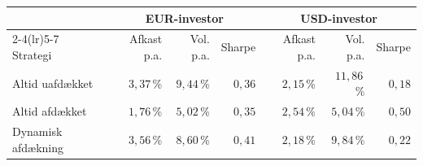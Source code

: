 \begin{tabular}{lrrrrrr}
\toprule
 & \multicolumn{3}{c}{EUR-investor} & \multicolumn{3}{c}{USD-investor} \\
\cmidrule(lr){2-4}\cmidrule(lr){5-7}
Strategi & Afkast p.a. & Vol. p.a. & Sharpe & Afkast p.a. & Vol. p.a. & Sharpe \\
\midrule
Altid uafdækket & $3{,}37$\,\% & $9{,}44$\,\% & $0{,}36$ & $2{,}15$\,\% & $11{,}86$\,\% & $0{,}18$ \\
Altid afdækket & $1{,}76$\,\% & $5{,}02$\,\% & $0{,}35$ & $2{,}54$\,\% & $5{,}04$\,\% & $0{,}50$ \\
Dynamisk afdækning & $3{,}56$\,\% & $8{,}60$\,\% & $0{,}41$ & $2{,}18$\,\% & $9{,}84$\,\% & $0{,}22$ \\
\bottomrule
\end{tabular}
